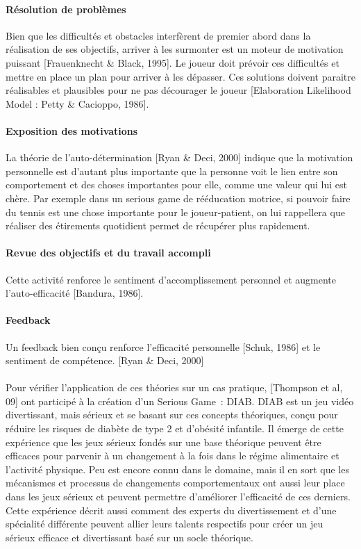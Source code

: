 			\paragraph{Résolution de problèmes \\ \quad}
Bien que les difficultés et obstacles interfèrent de premier abord dans la réalisation de ses objectifs, arriver à les surmonter est un moteur de motivation puissant [Frauenknecht \& Black, 1995]. Le joueur doit prévoir ces difficultés et mettre en place un plan pour arriver à les dépasser. Ces solutions doivent paraitre réalisables et plausibles pour ne pas décourager le joueur [Elaboration Likelihood Model : Petty \& Cacioppo, 1986].
			\paragraph{Exposition des motivations \\ \quad}
La théorie de l’auto-détermination [Ryan \& Deci, 2000] indique que la motivation personnelle est d’autant plus importante que la personne voit le lien entre son comportement et des choses importantes pour elle, comme une valeur qui lui est chère. Par exemple dans un serious game de rééducation motrice, si pouvoir faire du tennis est une chose importante pour le joueur-patient, on lui rappellera que réaliser des étirements quotidient permet de récupérer plus rapidement.
			\paragraph{Revue des objectifs et du travail accompli\\ \quad}
Cette activité renforce le sentiment d’accomplissement personnel et augmente l’auto-efficacité [Bandura, 1986].
			\paragraph{Feedback \\ \quad}
Un feedback bien conçu renforce l’efficacité personnelle [Schuk, 1986] et le sentiment de compétence. [Ryan \& Deci, 2000]
			
\paragraph{}
Pour vérifier l'application de ces théories sur un cas pratique, [Thompson et al, 09] ont participé à la création d'un Serious Game~: DIAB. DIAB est un jeu vidéo divertissant, mais sérieux et se basant sur ces concepts théoriques, conçu pour réduire les risques de diabète de type 2 et d’obésité infantile. Il émerge de cette expérience que les jeux sérieux fondés sur une base théorique peuvent être efficaces pour parvenir à un changement à la fois dans le régime alimentaire et l’activité physique. Peu est encore connu dans le domaine, mais il en sort que les mécanismes et processus de changements comportementaux ont aussi leur place dans les jeux sérieux et peuvent permettre d'améliorer l'efficacité de ces derniers. Cette expérience décrit aussi comment des experts du divertissement et d'une spécialité différente peuvent allier leurs talents respectifs pour créer un jeu sérieux efficace et divertissant basé sur un socle théorique. 

